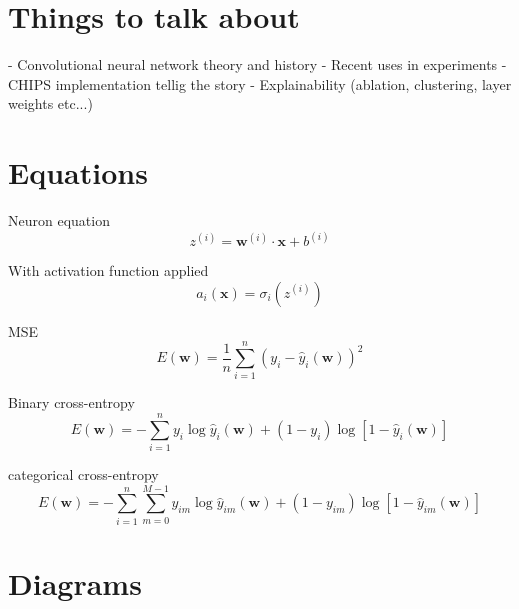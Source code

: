 \section{Things to talk about}
- Convolutional neural network theory and history
- Recent uses in experiments
- CHIPS implementation tellig the story
- Explainability (ablation, clustering, layer weights etc...)

\section{Equations}

Neuron equation
\begin{equation}
    z^{(i)}=\boldsymbol{w}^{(i)}\cdot\boldsymbol{x}+b^{(i)}
\end{equation}

With activation function applied
\begin{equation}
    a_{i}(\boldsymbol{x})=\sigma_i(z^{(i)})
\end{equation}

MSE
\begin{equation}
    E(\boldsymbol{w})=\frac{1}{n}\displaystyle\sum_{i=1}^{n}(y_{i}-\hat{y}_{i}(\boldsymbol{w}))^{2}
\end{equation}

Binary cross-entropy
\begin{equation}
    E(\boldsymbol{w})=-\displaystyle\sum_{i=1}^{n}y_{i}\log\hat{y}_{i}(\boldsymbol{w})+(1-y_{i})\log[1-\hat{y}_{i}(\boldsymbol{w})]
\end{equation}

categorical cross-entropy
\begin{equation}
    E(\boldsymbol{w})=-\displaystyle\sum_{i=1}^{n}\displaystyle\sum_{m=0}^{M-1}y_{im}\log\hat{y}_{im}(\boldsymbol{w})+(1-y_{im})\log[1-\hat{y}_{im}(\boldsymbol{w})]
\end{equation}

\section{Diagrams}

